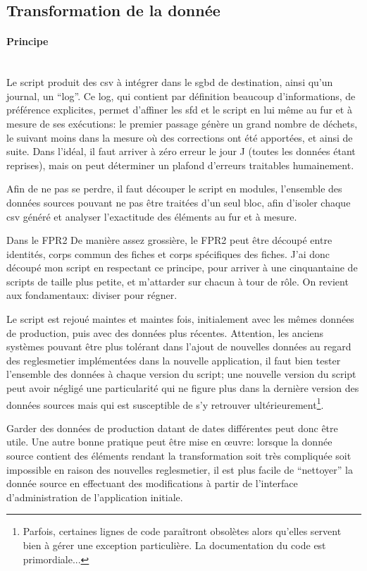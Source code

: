 \documentclass{book}
\newcommand{\myparagraph}[1]{\paragraph{#1}\mbox{}\\}
\begin{document}
\subsection{Transformation de la donnée}
\myparagraph{Principe}

Le script produit des \gls{csv} à intégrer dans le \gls{sgbd} de destination, ainsi qu'un journal, un ``log''. Ce log, qui contient par définition beaucoup d'informations, de préférence explicites, permet d'affiner les \gls{sfd} et le script en lui même au fur et à mesure de ses exécutions: le premier passage génère un grand nombre de déchets, le suivant moins dans la mesure où des corrections ont été apportées, et ainsi de suite. Dans l'idéal, il faut arriver à zéro erreur le jour J (toutes les données étant reprises), mais on peut déterminer un plafond d'erreurs traitables humainement.

Afin de ne pas se perdre, il faut découper le script en modules, l'ensemble des données sources pouvant ne pas être traitées d'un seul bloc, afin d'isoler chaque \gls{csv} généré et analyser l'exactitude des éléments au fur et à mesure.

\begin{bclogo}[arrondi = 0.1, couleur = blue!10, logo = \bcinfo]{Dans le FPR2}
De manière assez grossière, le FPR2 peut être découpé entre identités, corps commun des fiches et corps spécifiques des fiches. J'ai donc découpé mon script en respectant ce principe, pour arriver à une cinquantaine de scripts de taille plus petite, et m'attarder sur chacun à tour de rôle. On revient aux fondamentaux: diviser pour régner.
\end{bclogo}

Le script est rejoué maintes et maintes fois, initialement avec les mêmes données de production, puis avec des données plus récentes. Attention, les anciens systèmes pouvant être plus tolérant dans l'ajout de nouvelles données au regard des \gls{reglesmetier} implémentées dans la nouvelle application, il faut bien tester l'ensemble des données à chaque version du script; une nouvelle version du script peut avoir négligé une particularité qui ne figure plus dans la dernière version des données sources mais qui est susceptible de s'y retrouver ultérieurement\footnote{Parfois, certaines lignes de code paraîtront obsolètes alors qu'elles servent bien à gérer une exception particulière. La documentation du code est primordiale...}.

Garder des données de production datant de dates différentes peut donc être utile. Une autre bonne pratique peut être mise en œuvre: lorsque la donnée source contient des éléments rendant la transformation soit très compliquée soit impossible en raison des nouvelles \gls{reglesmetier}, il est plus facile de ``nettoyer'' la donnée source en effectuant des modifications à partir de l'interface d'administration de l'application initiale.
\end{document}
